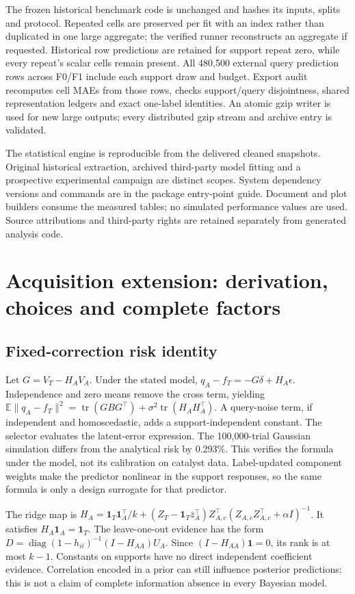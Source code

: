 \documentclass[11pt]{article}
\begin{document}
The frozen historical benchmark code is unchanged and hashes its inputs, splits and protocol. Repeated cells are preserved per fit with an index rather than duplicated in one large aggregate; the verified runner reconstructs an aggregate if requested. Historical row predictions are retained for support repeat zero, while every repeat's scalar cells remain present. All 480,500 external query prediction rows across F0/F1 include each support draw and budget. Export audit recomputes cell MAEs from those rows, checks support/query disjointness, shared representation ledgers and exact one-label identities. An atomic gzip writer is used for new large outputs; every distributed gzip stream and archive entry is validated.

The statistical engine is reproducible from the delivered cleaned snapshots. Original historical extraction, archived third-party model fitting and a prospective experimental campaign are distinct scopes. System dependency versions and commands are in the package entry-point guide. Document and plot builders consume the measured tables; no simulated performance values are used. Source attributions and third-party rights are retained separately from generated analysis code.

\clearpage
\section{Acquisition extension: derivation, choices and complete factors}
\subsection{Fixed-correction risk identity}
Let $G=V_T-H_AV_A$. Under the stated model, $q_A-f_T=-G\delta+H_A\epsilon$. Independence and zero means remove the cross term, yielding $\mathbb E\|q_A-f_T\|^2=\operatorname{tr}(GBG^\top)+\sigma^2\operatorname{tr}(H_AH_A^\top)$. A query-noise term, if independent and homoscedastic, adds a support-independent constant. The selector evaluates the latent-error expression. The 100,000-trial Gaussian simulation differs from the analytical risk by 0.293\%. This verifies the formula under the model, not its calibration on catalyst data. Label-updated component weights make the predictor nonlinear in the support responses, so the same formula is only a design surrogate for that predictor.

The ridge map is $H_A=\mathbf1_T\mathbf1_A^\top/k+(Z_T-\mathbf1_T\bar z_A^\top)Z_{A,c}^\top(Z_{A,c}Z_{A,c}^\top+\alpha I)^{-1}$. It satisfies $H_A\mathbf1_A=\mathbf1_T$. The leave-one-out evidence has the form $D=\operatorname{diag}(1-h_{ii})^{-1}(I-H_{AA})U_A$. Since $(I-H_{AA})\mathbf1=0$, its rank is at most $k-1$. Constants on supports have no direct independent coefficient evidence. Correlation encoded in a prior can still influence posterior predictions; this is not a claim of complete information absence in every Bayesian model.
\end{document}
